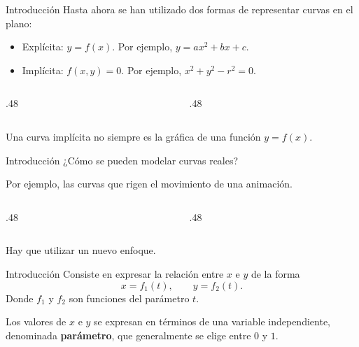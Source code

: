 \documentclass[original_version/main.tex]{subfiles}
\begin{document}
\graphicspath{{imagenes/tema11/}{../imagenes/tema11/}}


\begin{frame}[t]{Introducción}
Hasta ahora se han utilizado dos formas de representar curvas en el plano:\begin{itemize}
\item Explícita: $y=f(x)$. Por ejemplo, $y=ax^2+bx+c$.
\item Implícita: $f(x,y)=0$. Por ejemplo, $x^2+y^2-r^2=0$.
\end{itemize}\begin{columns}[T]\begin{column}{.48\textwidth}\end{column}\begin{column}{.48\textwidth}\end{column}\end{columns}Una curva implícita no siempre es la gráfica de una función $y=f(x)$.
\end{frame}

\begin{frame}[t]{Introducción}
¿Cómo se pueden modelar curvas reales?\par\medskip Por ejemplo, las curvas que rigen el movimiento de una animación.\begin{columns}[T]\begin{column}{.48\textwidth}\end{column}\begin{column}{.48\textwidth}\end{column}\end{columns}\begin{center}\large Hay que utilizar un nuevo enfoque.\end{center}
\end{frame}

\begin{frame}[t]{Introducción}
Consiste en expresar la relación entre $x$ e $y$ de la forma\[x=f_1(t),\qquad y=f_2(t).\]Donde $f_1$ y $f_2$ son funciones del parámetro $t$.\par\bigskip Los valores de $x$ e $y$ se expresan en términos de una variable independiente, denominada \textbf{parámetro}, que generalmente se elige entre $0$ y $1$.
\end{frame}
\end{document}
